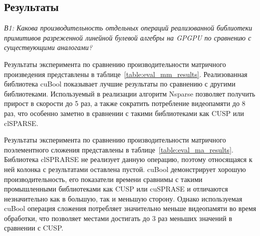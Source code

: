 \subsection{Результаты}


\textit{В1: Какова производительность отдельных операций реализованной библиотеки примитивов разреженной линейной булевой алгебры на GPGPU по сравнению с существующими аналогами?} 

Результаты эксперимента по сравнению производительности матричного произведения представлены в таблице~\ref{table:eval_mm_results}.
Реализованная библиотека cuBool показывает лучшие результаты по сравнению с другими библиотеками. 
Используемый в реализации алгоритм Nsparse позволяет получить прирост в скорости до 5 раз, а также сократить потребление видеопамяти до 8 раз, что особенно заметно в сравнении с такими библиотеками как CUSP или clSPARSE.

Результаты эксперимента по сравнению производительности матричного поэлементного сложения представлены в таблице~\ref{table:eval_ma_results}. 
Библиотека clSPRARSE не реализует данную операцию, поэтому относящаяся к ней колонка с результатами оставлена пустой.
cuBool демонстрирует хорошую производительность, его показатели времени сравнимы с такими промышленными библиотеками как CUSP или cuSPRASE и отличаются незначительно как в большую, так и меньшую сторону. 
Однако используемая cuBool операция сложения потребляет значительно меньше видеопамяти во время обработки, что позволяет местами достигать до 3 раз меньших значений в сравнении с CUSP.


